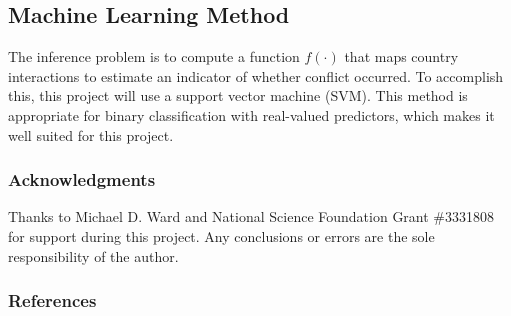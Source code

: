 \documentclass[12pt,letterpaper]{article} %
\begin{document}
\subsection{Machine Learning Method}


The inference problem is to compute a function $f(\cdot)$ that maps country interactions to estimate an indicator of whether conflict occurred. To accomplish this, this project will use a support vector machine (SVM). This method is appropriate for binary classification with real-valued predictors, which makes it well suited for this project.










\subsubsection*{Acknowledgments}

Thanks to Michael D. Ward and National Science Foundation Grant \#3331808 for support during this project. Any conclusions or errors are the sole responsibility of the author.

\subsubsection*{References}



\begingroup
\renewcommand{\section}[2]{}


\endgroup
\end{document}
